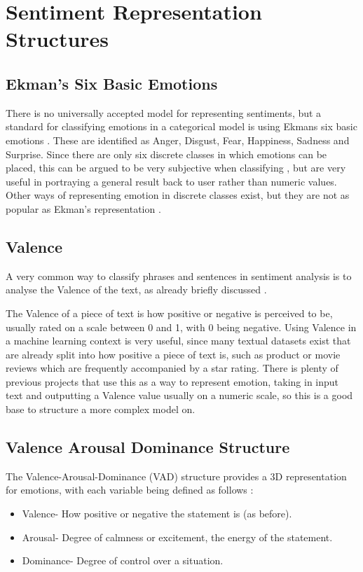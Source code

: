 
\section{Sentiment Representation Structures}

\subsection{Ekman's Six Basic Emotions}

There is no universally accepted model for representing sentiments, but a standard for classifying emotions in a categorical model is using Ekmans six basic emotions \cite{Ekman}. These are identified as Anger, Disgust, Fear, Happiness, Sadness and Surprise. Since there are only six discrete classes in which emotions can be placed, this can be argued to be very subjective when classifying \cite{emoBank}, but are very useful in portraying a general result back to user rather than numeric values. Other ways of representing emotion in discrete classes exist, but they are not as popular as Ekman's representation \cite{izard1993stability}.

\subsection{Valence}
A very common way to classify phrases and sentences in sentiment analysis is to analyse the Valence of the text, as already briefly discussed \cite{frijda1986emotions}.

The Valence of a piece of text is how positive or negative is perceived to be, usually rated on a scale between 0 and 1, with 0 being negative.
Using Valence in a machine learning context is very useful, since many textual datasets exist that are already split into how positive a piece of text is, such as product or movie reviews which are frequently accompanied by a star rating. There is plenty of previous projects that use this as a way to represent emotion, taking in input text and outputting a Valence value usually on a numeric scale, so this is a good base to structure a more complex model on.

\subsection{Valence Arousal Dominance Structure}

The Valence-Arousal-Dominance (VAD) structure provides a 3D representation for emotions, with each variable being defined as follows \cite{VAD}:
\begin{itemize}
    \item Valence- How positive or negative the statement is (as before).
    \item Arousal- Degree of calmness or excitement, the energy of the statement. 
    \item Dominance- Degree of control over a situation.
\end{itemize}

